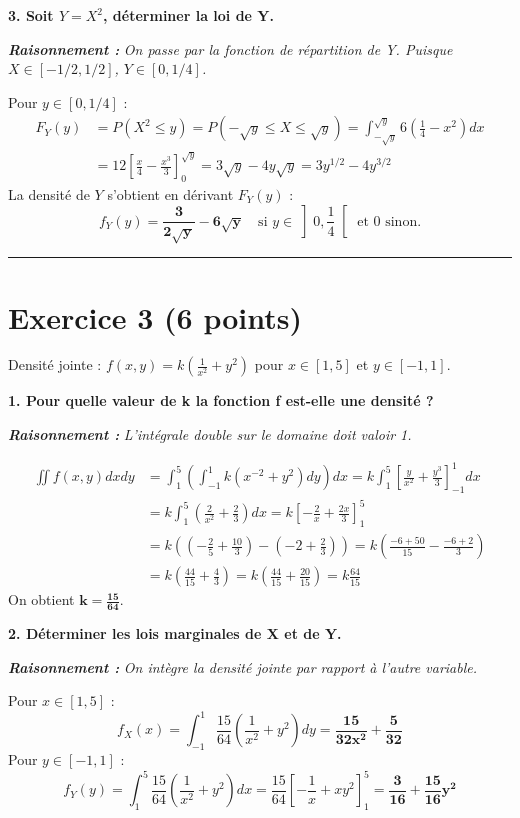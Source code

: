 \documentclass[11pt,a4paper]{article}
\newcommand{\raisonnement}[1]{
    \vspace{0.2cm}
    \noindent\textcolor{blue!80!black}{
        \textbf{\textit{Raisonnement : }} \textit{#1}
    }
    \vspace{0.2cm}
}
\begin{document}
\textbf{3. Soit $Y=X^2$, déterminer la loi de Y.}
\raisonnement{On passe par la fonction de répartition de Y. Puisque $X \in [-1/2, 1/2]$, $Y \in [0, 1/4]$.}
Pour $y \in [0, 1/4]$ :
\begin{align*}
F_Y(y) &= P(X^2 \le y) = P(-\sqrt{y} \le X \le \sqrt{y}) = \int_{-\sqrt{y}}^{\sqrt{y}} 6\left(\frac{1}{4}-x^2\right) dx \\
&= 12 \left[ \frac{x}{4} - \frac{x^3}{3} \right]_0^{\sqrt{y}} = 3\sqrt{y} - 4y\sqrt{y} = 3y^{1/2} - 4y^{3/2}
\end{align*}
La densité de $Y$ s'obtient en dérivant $F_Y(y)$ :
$$ f_Y(y) = \mathbf{\frac{3}{2\sqrt{y}} - 6\sqrt{y}} \quad \text{si } y \in \left]0, \frac{1}{4}\right[ \text{ et } 0 \text{ sinon.} $$

\vspace{0.5cm}
\hrule
\vspace{0.5cm}

\section*{Exercice 3 (6 points)}

Densité jointe : $f(x,y) = k\left(\frac{1}{x^2} + y^2\right)$ pour $x \in [1, 5]$ et $y \in [-1, 1]$.

\textbf{1. Pour quelle valeur de k la fonction f est-elle une densité ?}
\raisonnement{L'intégrale double sur le domaine doit valoir 1.}
\begin{align*}
\iint f(x,y) dx dy &= \int_1^5 \left( \int_{-1}^1 k(x^{-2} + y^2) dy \right) dx = k \int_1^5 \left[ \frac{y}{x^2} + \frac{y^3}{3} \right]_{-1}^1 dx \\
&= k \int_1^5 \left( \frac{2}{x^2} + \frac{2}{3} \right) dx = k \left[ -\frac{2}{x} + \frac{2x}{3} \right]_1^5 \\
&= k \left( \left(-\frac{2}{5} + \frac{10}{3}\right) - \left(-2 + \frac{2}{3}\right) \right) = k \left( \frac{-6+50}{15} - \frac{-6+2}{3} \right) \\
&= k \left( \frac{44}{15} + \frac{4}{3} \right) = k \left( \frac{44}{15} + \frac{20}{15} \right) = k \frac{64}{15}
\end{align*}
On obtient $\mathbf{k = \frac{15}{64}}$.

\textbf{2. Déterminer les lois marginales de X et de Y.}
\raisonnement{On intègre la densité jointe par rapport à l'autre variable.}
Pour $x \in [1, 5]$ :
$$ f_X(x) = \int_{-1}^1 \frac{15}{64} \left( \frac{1}{x^2} + y^2 \right) dy = \mathbf{\frac{15}{32x^2} + \frac{5}{32}} $$
Pour $y \in [-1, 1]$ :
$$ f_Y(y) = \int_1^5 \frac{15}{64} \left( \frac{1}{x^2} + y^2 \right) dx = \frac{15}{64} \left[ -\frac{1}{x} + xy^2 \right]_1^5 = \mathbf{\frac{3}{16} + \frac{15}{16}y^2} $$
\end{document}

